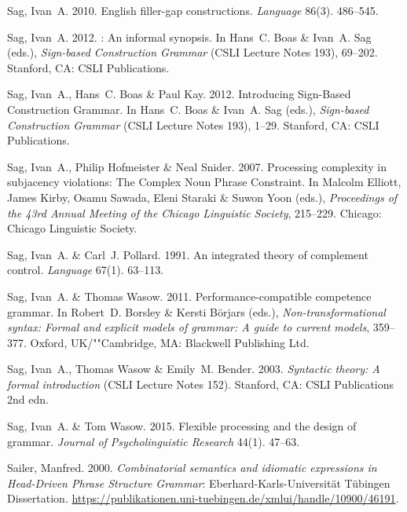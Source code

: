 \begin{thebibliography}{1420}
Sag, Ivan~A. 2010.
\newblock English filler-gap constructions.
\newblock \emph{Language} 86(3). 486--545.

Sag, Ivan~A. 2012.
: {An} informal synopsis.
\newblock In Hans~C. Boas \& Ivan~A. Sag (eds.), \emph{{Sign-based Construction
  Grammar}} (CSLI Lecture Notes 193), 69--202. Stanford, CA: CSLI Publications.

Sag, Ivan~A., Hans~C. Boas \& Paul Kay. 2012.
\newblock Introducing {Sign-Based Construction Grammar}.
\newblock In Hans~C. Boas \& Ivan~A. Sag (eds.), \emph{{Sign-based Construction
  Grammar}} (CSLI Lecture Notes 193), 1--29. Stanford, CA: CSLI Publications.

Sag, Ivan~A., Philip Hofmeister \& Neal Snider. 2007.
\newblock Processing complexity in subjacency violations: {The} {Complex Noun
  Phrase Constraint}.
\newblock In Malcolm Elliott, James Kirby, Osamu Sawada, Eleni Staraki \& Suwon
  Yoon (eds.), \emph{Proceedings of the {43rd Annual Meeting of the Chicago
  Linguistic Society}}, 215--229. Chicago: Chicago Linguistic Society.

Sag, Ivan~A. \& Carl~J. Pollard. 1991.
\newblock An integrated theory of complement control.
\newblock \emph{Language} 67(1). 63--113.

Sag, Ivan~A. \& Thomas Wasow. 2011.
\newblock Performance-compatible competence grammar.
\newblock In Robert~D. Borsley \& Kersti B{\"o}rjars (eds.),
  \emph{Non-transformational syntax: {Formal} and explicit models of grammar:
  {A} guide to current models}, 359--377. Oxford, UK/""Cambridge, MA: Blackwell
  Publishing Ltd.

Sag, Ivan~A., Thomas Wasow \& Emily~M. Bender. 2003.
\newblock \emph{Syntactic theory: {A} formal introduction} (CSLI Lecture Notes
  152).
\newblock Stanford, CA: CSLI Publications 2nd edn.

Sag, Ivan~A. \& Tom Wasow. 2015.
\newblock Flexible processing and the design of grammar.
\newblock \emph{Journal of Psycholinguistic Research} 44(1). 47--63.

Sailer, Manfred. 2000.
\newblock \emph{Combinatorial semantics and idiomatic expressions in
  {{Head-Driven Phrase Structure Grammar}}}: Eberhard-Karls-Universit{\"a}t
  T{\"u}bingen Dissertation.
\newblock
  \urlprefix\url{https://publikationen.uni-tuebingen.de/xmlui/handle/10900/46191}.


\end{thebibliography}
